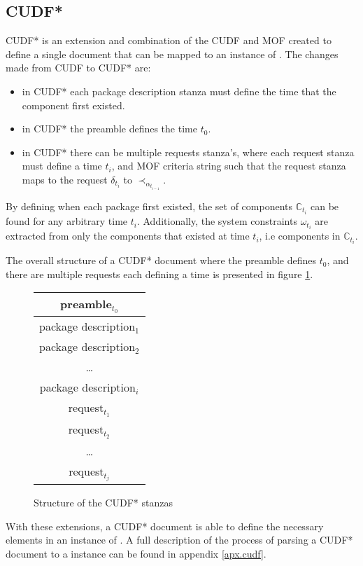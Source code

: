 \subsection{CUDF*}
\label{formal.cudfstar}
CUDF* is an extension and combination of the CUDF and MOF created to define a single document that can be mapped to an instance of \modelname.
The changes made from CUDF to CUDF* are:
\begin{itemize}
  \item in CUDF* each package description stanza must define the time that the component first existed.
  \item in CUDF* the preamble defines the time $t_0$. 
  \item in CUDF* there can be multiple requests stanza's, where each request stanza must define a time $t_i$, and MOF criteria string
  such that the request stanza maps to the request $\delta_{t_i}$ to $\prec_{\alpha_{t_{i-1}}}$.
\end{itemize}

By defining when each package first existed, the set of components $\mathbb{C}_{t_i}$ can be found for any arbitrary time $t_i$.
Additionally, the system constraints $\omega_{t_i}$ are extracted from only the components that existed at time $t_i$, i.e components in $\mathbb{C}_{t_i}$.

The overall structure of a CUDF* document where the preamble defines $t_0$, and there are multiple requests each defining a time is presented in figure \ref{formal.cudfstarstruct}.
\begin{figure}[htp]
\centering
\begin{tabular}{|c|}
\hline preamble$_{t_0}$ \\ \hline
\hline package description$_{1}$ \\ \hline
\hline package description$_{2}$ \\ \hline
 \multicolumn{1}{c}{\ldots}  \\ 
\hline package description$_{i}$\\ \hline
\hline request$_{t_1}$\\ \hline
\hline request$_{t_2}$\\ \hline
\multicolumn{1}{c}{\ldots}  \\
\hline request$_{t_j}$\\ \hline
\end{tabular}
\caption{Structure of the CUDF* stanzas}
\label{formal.cudfstarstruct}
\end{figure}

With these extensions, a CUDF* document is able to define the necessary elements in an instance of \modelname.
A full description of the process of parsing a CUDF* document to a \modelname instance can be found in appendix \ref{apx.cudf}.

